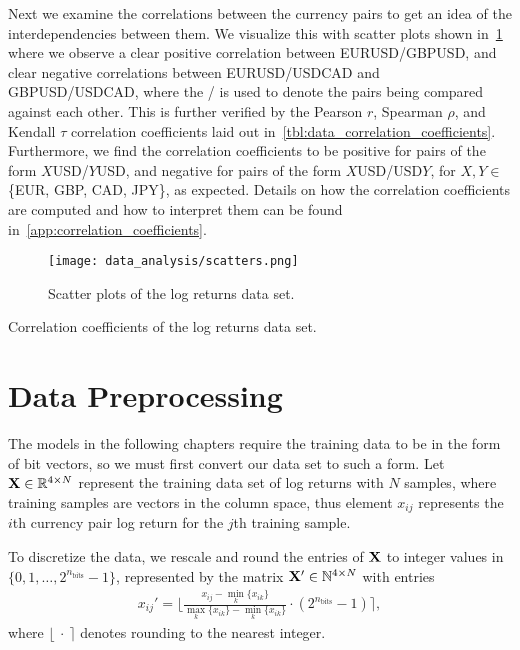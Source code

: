 Next we examine the correlations between the currency pairs to get an idea of the interdependencies between them.
We visualize this with scatter plots shown in~\cref{fig:scatters} where we observe a clear positive correlation between EURUSD/GBPUSD, and clear negative correlations between EURUSD/USDCAD and GBPUSD/USDCAD, where the / is used to denote the pairs being compared against each other.
This is further verified by the Pearson \( r \), Spearman \( \rho \), and Kendall \( \tau \) correlation coefficients laid out in~\cref{tbl:data_correlation_coefficients}.
Furthermore, we find the correlation coefficients to be positive for pairs of the form \( X \)USD/\( Y \)USD, and negative for pairs of the form \( X \)USD/USD\( Y \), for \( X,Y \in \) \{EUR, GBP, CAD, JPY\}, as expected.
Details on how the correlation coefficients are computed and how to interpret them can be found in~\cref{app:correlation_coefficients}.
\begin{figure}[!htb]
    \begin{center}
        \texttt{[image: data\_analysis/scatters.png]}
    \end{center}
    \caption{Scatter plots of the log returns data set.}
    \label{fig:scatters}
\end{figure}

\begin{table}[!htb]
    \centering
    \begin{adjustbox}{max width=\textwidth}
        
    \end{adjustbox}
    \caption{Correlation coefficients of the log returns data set.}
    \label{tbl:data_correlation_coefficients}
\end{table}


\section{Data Preprocessing}
The models in the following chapters require the training data to be in the form of bit vectors, so we must first convert our data set to such a form.
Let \( \mathbf{X} \in \mathbb{R}^{4 \times N} \) represent the training data set of log returns with \( N \) samples, where training samples are vectors in the column space, thus element \( x_{ij} \) represents the \( i \)th currency pair log return for the \( j \)th training sample.

To discretize the data, we rescale and round the entries of \( \mathbf{X} \) to integer values in \( \{0, 1, \dots, 2^{n_\text{bits}} - 1\} \), represented by the matrix \( \mathbf{X}' \in \mathbb{N}^{4 \times N} \) with entries
\begin{align}
    x_{ij}' = \bigg\lfloor \frac{x_{ij} - \min_k \{x_{ik}\}}{\max_k \{x_{ik}\} - \min_k \{x_{ik}\}} \cdot (2^{n_\text{bits}} - 1) \bigg\rceil,
\end{align}
where \( \lfloor \ \cdot \ \rceil \) denotes rounding to the nearest integer.

